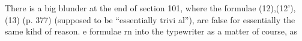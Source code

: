 There is a big blunder at the end of section 101,  where the
formulae (12),(12'),(13) (p. 377)  (supposed to be ``essentially trivi\inserted{-}%
al''),  are false for essentially the same kihd of reason.  e 
 formulae rn into the typewriter as a matter of course,  as 


